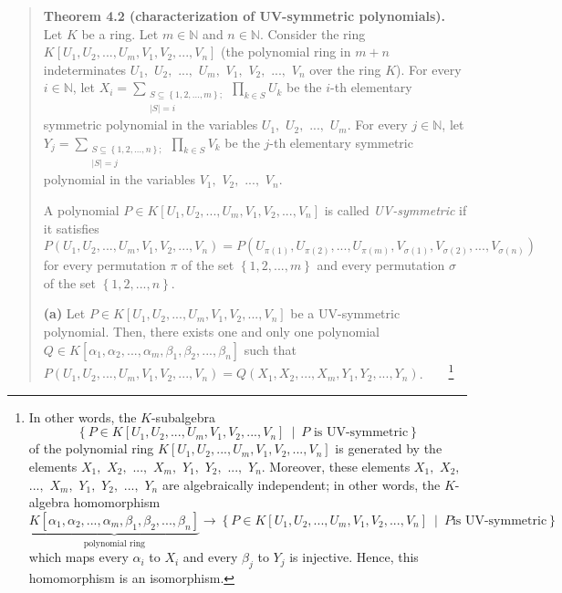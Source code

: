 \documentclass[numbers=enddot,12pt,final,onecolumn,notitlepage]{scrartcl}%
\begin{document}
\begin{quote}
\textbf{Theorem 4.2 (characterization of UV-symmetric polynomials).} Let $K$
be a ring. Let $m\in\mathbb{N}$ and $n\in\mathbb{N}$. Consider the ring
$K\left[  U_{1},U_{2},...,U_{m},V_{1},V_{2},...,V_{n}\right]  $ (the
polynomial ring in $m+n$ indeterminates $U_{1},$ $U_{2},$ $...,$ $U_{m},$
$V_{1},$ $V_{2},$ $...,$ $V_{n}$ over the ring $K$). For every $i\in
\mathbb{N}$, let $X_{i}=\sum\limits_{\substack{S\subseteq\left\{
1,2,...,m\right\}  ;\\\left\vert S\right\vert =i}}\prod\limits_{k\in S}U_{k}$
be the $i$-th elementary symmetric polynomial in the variables $U_{1},$
$U_{2},$ $...,$ $U_{m}$. For every $j\in\mathbb{N}$, let $Y_{j}=\sum
\limits_{\substack{S\subseteq\left\{  1,2,...,n\right\}  ;\\\left\vert
S\right\vert =j}}\prod\limits_{k\in S}V_{k}$ be the $j$-th elementary
symmetric polynomial in the variables $V_{1},$ $V_{2},$ $...,$ $V_{n}$.

A polynomial $P\in K\left[  U_{1},U_{2},...,U_{m},V_{1},V_{2},...,V_{n}%
\right]  $ is called \textit{UV-symmetric} if it satisfies%
\[
P\left(  U_{1},U_{2},...,U_{m},V_{1},V_{2},...,V_{n}\right)  =P\left(
U_{\pi\left(  1\right)  },U_{\pi\left(  2\right)  },...,U_{\pi\left(
m\right)  },V_{\sigma\left(  1\right)  },V_{\sigma\left(  2\right)
},...,V_{\sigma\left(  n\right)  }\right)
\]
for every permutation $\pi$ of the set $\left\{  1,2,...,m\right\}  $ and
every permutation $\sigma$ of the set $\left\{  1,2,...,n\right\}  $.

\textbf{(a)} Let $P\in K\left[  U_{1},U_{2},...,U_{m},V_{1},V_{2}%
,...,V_{n}\right]  $ be a UV-symmetric polynomial. Then, there exists one and
only one polynomial $Q\in K\left[  \alpha_{1},\alpha_{2},...,\alpha_{m}%
,\beta_{1},\beta_{2},...,\beta_{n}\right]  $ such that $P\left(  U_{1}%
,U_{2},...,U_{m},V_{1},V_{2},...,V_{n}\right)  =Q\left(  X_{1},X_{2}%
,...,X_{m},Y_{1},Y_{2},...,Y_{n}\right)  $.\ \ \ \ \footnote{In other words,
the $K$-subalgebra%
\[
\left\{  P\in K\left[  U_{1},U_{2},...,U_{m},V_{1},V_{2},...,V_{n}\right]
\ \mid\ P\text{ is UV-symmetric}\right\}
\]
of the polynomial ring $K\left[  U_{1},U_{2},...,U_{m},V_{1},V_{2}%
,...,V_{n}\right]  $ is generated by the elements $X_{1},$ $X_{2},$ $...,$
$X_{m},$ $Y_{1},$ $Y_{2},$ $...,$ $Y_{n}$. Moreover, these elements $X_{1},$
$X_{2},$ $...,$ $X_{m},$ $Y_{1},$ $Y_{2},$ $...,$ $Y_{n}$ are algebraically
independent; in other words, the $K$-algebra homomorphism%
\[
\underbrace{K\left[  \alpha_{1},\alpha_{2},...,\alpha_{m},\beta_{1},\beta
_{2},...,\beta_{n}\right]  }_{\text{polynomial ring}}\rightarrow\left\{  P\in
K\left[  U_{1},U_{2},...,U_{m},V_{1},V_{2},...,V_{n}\right]  \ \mid\ P\text{
is UV-symmetric}\right\}
\]
which maps every $\alpha_{i}$ to $X_{i}$ and every $\beta_{j}$ to $Y_{j}$ is
injective. Hence, this homomorphism is an isomorphism.}


\end{quote}
\end{document}
